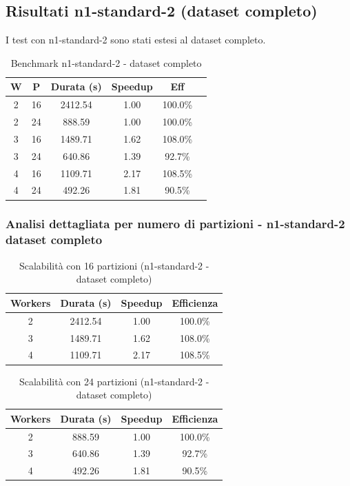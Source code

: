\documentclass[8pt,a4paper]{article}
\begin{document}
\subsection{Risultati n1-standard-2 (dataset completo)}

I test con n1-standard-2 sono stati estesi al dataset completo.

\begin{table}[H]
\centering
\caption{Benchmark n1-standard-2 - dataset completo}
\label{tab:n1_full_results}
\footnotesize
\begin{tabular}{|c|c|c|c|c|c|}
\hline
\textbf{W} & \textbf{P} & \textbf{Durata (s)} & \textbf{Speedup} & \textbf{Eff} \\
\hline
2 & 16 & 2412.54 & 1.00 & 100.0\% \\
2 & 24 & 888.59 & 1.00 & 100.0\% \\
\hline
3 & 16 & 1489.71 & 1.62 & 108.0\% \\
3 & 24 & 640.86 & 1.39 & 92.7\% \\
\hline
4 & 16 & 1109.71 & 2.17 & 108.5\% \\
4 & 24 & 492.26 & 1.81 & 90.5\% \\
\hline
\end{tabular}
\end{table}


\subsubsection{Analisi dettagliata per numero di partizioni - n1-standard-2 dataset completo}

\begin{table}[H]
\centering
\caption{Scalabilità con 16 partizioni (n1-standard-2 - dataset completo)}
\begin{tabular}{|c|c|c|c|}
\hline
\textbf{Workers} & \textbf{Durata (s)} & \textbf{Speedup} & \textbf{Efficienza} \\
\hline
2 & 2412.54 & 1.00 & 100.0\% \\
3 & 1489.71 & 1.62 & 108.0\% \\
4 & 1109.71 & 2.17 & 108.5\% \\
\hline
\end{tabular}
\end{table}

\begin{table}[H]
\centering
\caption{Scalabilità con 24 partizioni (n1-standard-2 - dataset completo)}
\begin{tabular}{|c|c|c|c|}
\hline
\textbf{Workers} & \textbf{Durata (s)} & \textbf{Speedup} & \textbf{Efficienza} \\
\hline
2 & 888.59 & 1.00 & 100.0\% \\
3 & 640.86 & 1.39 & 92.7\% \\
4 & 492.26 & 1.81 & 90.5\% \\
\hline
\end{tabular}
\end{table}
\end{document}
